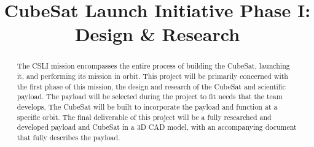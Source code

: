\documentclass[conference]{IEEEtran} %
\title{CubeSat Launch Initiative Phase I\@: \\ Design \& Research}
\author{
  \IEEEauthorblockN{%
    James~Parkus\IEEEauthorrefmark{1},  %
    Austin~Bodzas\IEEEauthorrefmark{2}
  }
  \IEEEauthorblockA{%
    RIT Space Exploration, Rochester Institute of Technology \\ %
    Rochester, N.Y. \\
    Email:
    \IEEEauthorrefmark{1}jep7631@rit.edu,
    \IEEEauthorrefmark{2}abb6499@rit.edu
  }

}
\begin{document}
\maketitle%

\begin{abstract}
The CSLI mission encompasses the entire process of building the CubeSat, launching it, and performing its mission in orbit. This project will be primarily concerned
with the first phase of this mission, the design and research of the CubeSat and scientific payload. The payload will be selected during the project to fit needs
that the team develops. The CubeSat will be built to incorporate the payload and function at a specific orbit. The final deliverable of this project will be a
fully researched and developed payload and CubeSat in a 3D CAD model, with an accompanying document that fully describes the payload.

\end{abstract}
\end{document}
